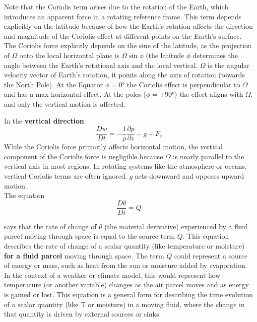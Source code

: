 Note that the Coriolis term arises due to the rotation of the Earth, which introduces an apparent force in a rotating reference frame. This term depends explicitly on the latitude because of how the Earth's rotation affects the direction and magnitude of the Coriolis effect at different points on the Earth's surface. The Coriolis force explicitly depends on the sine of the latitude, as the projection of $\Omega$ onto the local horizontal plane is $\Omega\sin\phi$ (the latitude $\phi$ determines the angle between the Earth's rotational axis and the local vertical. $\Omega$ is the angular velocity vector of Earth's rotation, it points along the axis of rotation (towards the North Pole). At the Equator $\phi=0°$ the Coriolis effect is perpendicular to $\Omega$ and has a max horizontal effect. At the poles ($\phi=\pm 90°$) the effect aligns with $\Omega$, and only the vertical motion is affected.

In the \textbf{vertical direction}:
\begin{equation}
    \frac{Dw}{Dt}=-\frac{1}{\rho}\frac{\partial p}{\partial z}-g+F_z
\end{equation}
While the Coriolis force primarily affects horizontal motion, the vertical component of the Coriolis force is negligible because $\Omega$ is nearly parallel to the vertical axis in most regions. In rotating systems like the atmosphere or oceans, vertical Coriolis terms are often ignored. $g$ acts downward and opposes upward motion.
\\


The equation
\begin{equation}
    \frac{D\theta}{Dt}=Q
\end{equation}

says that the rate of change of $\theta$ (the material derivative) experienced by a fluid parcel moving through space is equal to the source term $Q$. This equation describes the rate of change of a scalar quantity (like temperature or moisture) \textbf{for a fluid parcel} moving through space. The term $Q$ could represent a source of energy or mass, such as heat from the sun or moisture added by evaporation. In the context of a weather or climate model, this would represent how temperature (or another variable) changes as the air parcel moves and as energy is gained or lost.
This equation is a general form for describing the time evolution of a scalar quantity (like T or moisture) in a moving fluid, where the change in that quantity is driven by external sources or sinks.
\\



